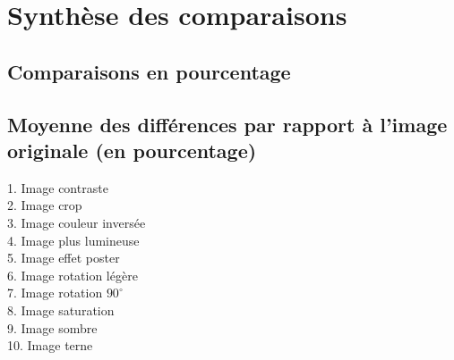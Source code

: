 \section{Synthèse des comparaisons}\label{synthese-des-comparaisons}

\subsection{Comparaisons en pourcentage}
\begin{table}[htbp]
\centering
{}
\end{table}

\subsection{Moyenne des différences par rapport à l'image originale (en pourcentage)}
\begin{bchart}[step=10,max=50,width=7in]
\centering
            \smallskip
            \smallskip
            \smallskip
            \smallskip
            \smallskip
            \smallskip
            \smallskip
            \smallskip
            \smallskip
\end{bchart}

1.  Image contraste \\
2.  Image crop \\
3.  Image couleur inversée \\
4.  Image plus lumineuse \\
5.  Image effet poster \\
6.  Image rotation légère \\
7.  Image rotation $90^{\circ}$ \\
8.  Image saturation \\
9.  Image sombre \\
10. Image terne \\

